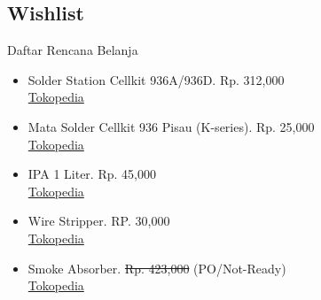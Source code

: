 \documentclass[table,dvipsnames]{beamer}
\begin{document}
	\subsection{Wishlist}
	
	\begin{frame}
		\begin{exampleblock}{Daftar Rencana Belanja}
			\begin{itemize}
				\item Solder Station Cellkit 936A/936D. Rp. 312,000\\
				\href{https://www.tokopedia.com/archive-dyahgaleryy-1630682557/solder-cellkit-936-analog-ck-936a-limited}{Tokopedia}
				
				\item Mata Solder Cellkit 936 Pisau (K-series). Rp. 25,000\\
				\href{https://www.tokopedia.com/cellkit/mata-solder-cellkit-936-model-pisau-miring-rohs-lead-free}{Tokopedia}
				
				\item IPA 1 Liter. Rp. 45,000\\
				\href{https://www.tokopedia.com/netafarmsurabaya/alkohol-ipa-isopropyl-alcohol-99-kemasan-1-liter}{Tokopedia}
				
				\item Wire Stripper. RP. 30,000\\
				\href{https://www.tokopedia.com/gudangperkakas18/tang-kupas-kabel-tang-potong-kabel-wire-stripper-7-inch-3-in-1}{Tokopedia}
				
				\item Smoke Absorber. \sout{Rp. 423,000} (PO/Not-Ready)\\
				\href{https://www.tokopedia.com/greenmall88/fa-400-solder-iron-smoke-absorber-fume-extractor-soldering-air-blower}{Tokopedia}
			\end{itemize}
		\end{exampleblock}
	\end{frame}
\end{document}
